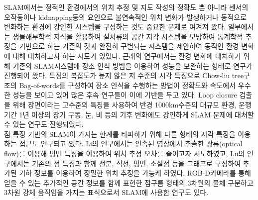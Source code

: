 \documentclass[master,korean,final]{cbnu-ecs}
\begin{document}
SLAM에서는 정적인 환경에서의 위치 추정 및 지도 작성의 정확도 뿐 아니라 센서의 오작동이나 kidnapping등의 요인으로 불연속적인 위치 변화가 발생하거나 동적으로 변화하는 환경에 강인한 시스템을 구성하는 것도 중요한 문제로 여겨져 왔다. 일부에서는 생물해부학적 지식을 활용하여 설치류의 공간 지각 시스템을 모방하여 통계학적 추정을 기반으로 하는 기존의 것과 완전히 구별되는 시스템을 제안하여 동적인 환경 변화에 대해 대처하고자 하는 시도가 있었다\cite{Milford2008}. 근래의 연구에서는 환경 변화에 대처하기 위해 기존의 SLAM시스템에 장소 인식 방법을 이용하여 성능을 보완하는 형태로 연구가 진행되어 왔다. 특징의 복잡도가 높지 않은 저 수준의 시각 특징으로 Chow-liu tree구조의 Bag-of-words를 구성하여 장소 인식을 수행하는 방법\cite{Cummins2011}이 정확도와 속도에서 우수한 성능을 보이고 있어 많은 후속 연구들이 이에 기반을 두고 있다. Loop closure 검출을 위해 장면이라는 고수준의 특징을 사용하여 반경 1000km수준의 대규모 환경, 운행 기간 1년 이상의 장기 구동, 눈, 비 등의 기후 변화에도 강인하게 SLAM 문제에 대처할 수 있는 연구도 진행되었다\cite{Milford2012}.\\
점 특징 기반의 SLAM이 가지는 한계를 타파하기 위해 다른 형태의 시각 특징을 이용하는 접근도 연구되고 있다. Li의 연구에서는 연속된 영상에서 추출한 광류(optical flow)를 이용해 평면 특징을 이용하여 위치 추정 오차를 줄이고자 시도하였고\cite{Li2014}, Lu의 연구에서는 기존의 점 특징과 함께 선분, 직선, 평면, 소실점 등을 그래프로 구성하여 추가된 기하 정보를 이용하여 정밀한 위치 추정을 가능케 하였다\cite{Lu2015}. RGB-D카메라를 통해 얻을 수 있는 추가적인 공간 정보를 함께 표현한 점구름 형태의 3차원의 물체 구분하고 3차원 강체 움직임을 가지는 표식으로서 SLAM에 사용한 연구도 있다\cite{Moreno2013}.
\end{document}
